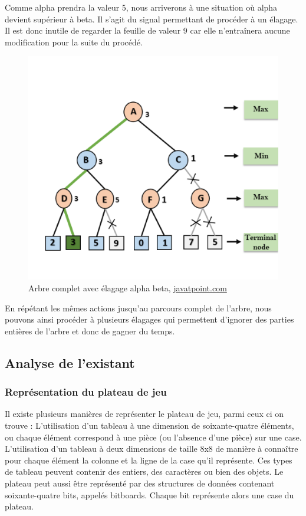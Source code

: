 \huge\documentclass{article}
\begin{document}
Comme alpha prendra la valeur 5, nous arriverons à une situation où alpha devient supérieur à beta. Il s'agit du signal permettant de procéder à un élagage. Il est donc inutile de regarder la feuille de valeur 9 car elle n'entraînera aucune modification pour la suite du procédé.

\begin{figure}[!h]
\centering
\includegraphics[scale=0.8]{img/alpha-beta-pruning-step8.png}
\caption{Arbre complet avec élagage alpha beta,
\href{https://www.javatpoint.com/ai-alpha-beta-pruning}{javatpoint.com}}
\end{figure}

En répétant les mêmes actions jusqu'au parcours complet de l'arbre, nous pouvons ainsi procéder à plusieurs élagages qui permettent d'ignorer des parties entières de l'arbre et donc de gagner du temps.

\subsection{Analyse de l'existant}
\subsubsection{Représentation du plateau de jeu}
Il existe plusieurs manières de représenter le plateau de jeu, parmi ceux ci on trouve :
L'utilisation d'un tableau à une dimension de soixante-quatre éléments, ou chaque élément correspond à une pièce (ou l'absence d'une pièce) sur une case.\newline 
L'utilisation d'un tableau à deux dimensions de taille 8x8 de manière à connaître pour chaque élément la colonne et la ligne de la case qu'il représente.\newline
Ces types de tableau peuvent contenir des entiers, des caractères ou bien des objets.\newline
Le plateau peut aussi être représenté par des structures de données contenant soixante-quatre bits, appelés bitboards. Chaque bit représente alors une case du plateau.
\end{document}
